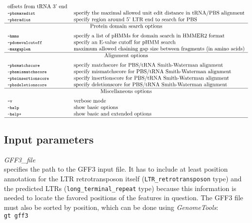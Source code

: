 \documentclass[12pt,titlepage]{article}
\newcommand{\GenomeTools}{\textit{GenomeTools}\xspace}
\begin{document}
\begin{table}[htbp]
\begin{footnotesize}
\[\begin{tabular}{ll}
offsets from tRNA 3' end
\\
\Showoption{pbsmaxedist}& specify the maximal allowed unit edit distance in
tRNA/PBS alignment
\\
\Showoption{pbsradius}& specify region around 5' LTR end to search for PBS
\\
\Showoptiongroup{Protein domain search options}
\Showoption{hmms}& specify a list of pHMMs for domain search in HMMER2 format
\\
\Showoption{pdomevalcutoff}& specify an E-value cutoff for pHMM search
\\
\Showoption{maxgaplen}& maximum allowed chaining gap size between fragments (in
amino acids)

\\
\Showoptiongroup{Alignment options}
\Showoption{pbsmatchscore}& specify matchscore for PBS/tRNA Smith-Waterman
alignment
\\
\Showoption{pbsmismatchscore}& specify mismatchscore for PBS/tRNA Smith-Waterman
alignment
\\
\Showoption{pbsinsertionscore}& specify insertionscore for PBS/tRNA
Smith-Waterman alignment
\\
\Showoption{pbsdeletionscore}& specify deletionscore for PBS/tRNA Smith-Waterman
alignment
\\
\Showoptiongroup{Miscellaneous options}
\Showoption{v}& verbose mode
\\
\Showoption{help}& show basic options
\\
\Showoption{help+}& show basic and extended options
\\
\hline
\end{tabular}
\]
\end{footnotesize}
\label{overviewOpt}
\end{table}

\newpage
\subsection{Input parameters}

\emph{GFF3\_file}\\ specifies the path to the GFF3 input file. It has to include
at least position annotation for the LTR retrotransposon itself
(\texttt{LTR\_retrotransposon} type) and the predicted LTRs
(\texttt{long\_terminal\_repeat} type) because this information is needed to
locate the favored positions of the features in question. The GFF3 file must
also be sorted by position, which can be done using \GenomeTools :\\
\texttt{gt gff3}  
\texttt{} \\
\end{document}
